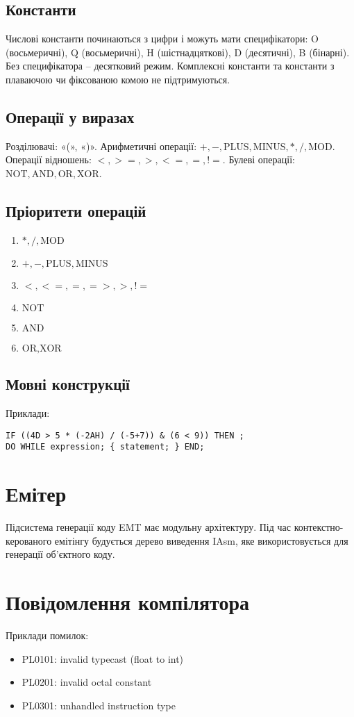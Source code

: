 \documentclass{memoir}
\begin{document}
\subsection{Константи}
Числові константи починаються з цифри і можуть мати специфікатори: O (восьмеричні), Q (восьмеричні), H (шістнадцяткові), D (десятичні), B (бінарні). Без специфікатора – десятковий режим. Комплексні константи та константи з плаваючою чи фіксованою комою не підтримуються.

\subsection{Операції у виразах}
Розділювачі: «(», «)». Арифметичні операції: \( +, -, \text{PLUS}, \text{MINUS}, *, /, \text{MOD} \). Операції відношень: \( <, >=, >, <=, =, != \). Булеві операції: \( \text{NOT}, \text{AND}, \text{OR}, \text{XOR} \).

\subsection{Пріоритети операцій}
\begin{enumerate}
    \item \( *, /, \text{MOD} \)
    \item \( +, -, \text{PLUS}, \text{MINUS} \)
    \item \( <, <=, =, =>, >, != \)
    \item \( \text{NOT} \)
    \item \( \text{AND} \)
    \item \( \text{OR}, \text{XOR} \)
\end{enumerate}

\subsection{Мовні конструкції}
Приклади:
\begin{lstlisting}
IF ((4D > 5 * (-2AH) / (-5+7)) & (6 < 9)) THEN ;
DO WHILE expression; { statement; } END;
\end{lstlisting}

\section{Емітер}
Підсистема генерації коду EMT має модульну архітектуру. Під час контекстно-керованого емітінгу будується дерево виведення IAsm, яке використовується для генерації об’єктного коду.

\section{Повідомлення компілятора}
Приклади помилок:
\begin{itemize}
    \item PL0101: invalid typecast (float to int)
    \item PL0201: invalid octal constant
    \item PL0301: unhandled instruction type
\end{itemize}
\end{document}

